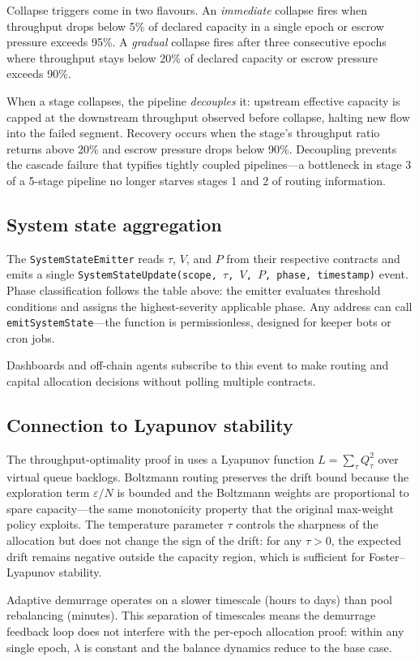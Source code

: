 Collapse triggers come in two flavours. An \emph{immediate} collapse
fires when throughput drops below 5\% of declared capacity in a single
epoch or escrow pressure exceeds 95\%. A \emph{gradual} collapse
fires after three consecutive epochs where throughput stays below 20\%
of declared capacity or escrow pressure exceeds 90\%.

When a stage collapses, the pipeline \emph{decouples} it: upstream
effective capacity is capped at the downstream throughput observed
before collapse, halting new flow into the failed segment. Recovery
occurs when the stage's throughput ratio returns above 20\% and escrow
pressure drops below 90\%. Decoupling prevents the cascade failure
that typifies tightly coupled pipelines---a bottleneck in stage 3
of a 5-stage pipeline no longer starves stages 1 and 2 of routing
information.

\subsection{System state aggregation}
\label{sec:systemstate}

The \texttt{SystemStateEmitter} reads $\tau$, $V$, and $P$ from their
respective contracts and emits a single
\texttt{SystemStateUpdate(scope, $\tau$, $V$, $P$, phase, timestamp)}
event. Phase classification follows the table above: the emitter
evaluates threshold conditions and assigns the highest-severity
applicable phase. Any address can call \texttt{emitSystemState}---the
function is permissionless, designed for keeper bots or cron jobs.

Dashboards and off-chain agents subscribe to this event to make
routing and capital allocation decisions without polling multiple
contracts.

\subsection{Connection to Lyapunov stability}

The throughput-optimality proof in  uses a
Lyapunov function $L = \sum_\tau Q_\tau^2$ over virtual queue
backlogs. Boltzmann routing preserves the drift bound because the
exploration term $\varepsilon / N$ is bounded and the Boltzmann
weights are proportional to spare capacity---the same monotonicity
property that the original max-weight policy exploits. The
temperature parameter $\tau$ controls the sharpness of the allocation
but does not change the sign of the drift: for any $\tau > 0$, the
expected drift remains negative outside the capacity region, which is
sufficient for Foster--Lyapunov stability.

Adaptive demurrage operates on a slower timescale (hours to days)
than pool rebalancing (minutes). This separation of timescales means
the demurrage feedback loop does not interfere with the per-epoch
allocation proof: within any single epoch, $\lambda$ is constant and
the balance dynamics reduce to the base case.
